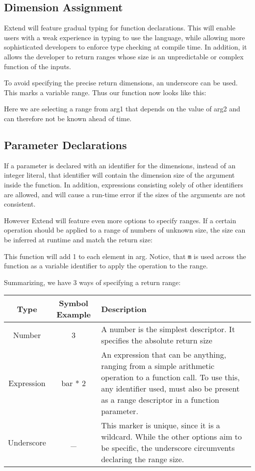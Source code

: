 \subsection{Dimension Assignment}
\par Extend will feature gradual typing for function declarations. This will enable users with a weak experience in typing to use the language, while allowing more sophisticated developers to enforce type checking at compile time. In addition, it allows the developer to return ranges whose size is an unpredictable or complex function of the inputs.
\par To avoid specifying the precise return dimensions, an underscore can be used. This marks a variable range. Thus our function now looks like this:

Here we are selecting a range from arg1 that depends on the value of arg2 and can therefore not be known ahead of time.
\subsection{Parameter Declarations}
If a parameter is declared with an identifier for the dimensions, instead of an integer literal, that identifier will contain the dimension size of the argument inside the function. In addition, expressions consisting solely of other identifiers are allowed, and will cause a run-time error if the sizes of the arguments are not consistent.
\par However Extend will feature even more options to specify ranges. If a certain operation should be applied to a range of numbers of unknown size, the size can be inferred at runtime and match the return size:

This function will add 1 to each element in arg. Notice, that \texttt{m} is used across the function as a variable identifier to apply the operation to the range.
\par Summarizing, we have 3 ways of specifying a return range:\newline
\begin{tabularx}{\columnwidth}{| c | c | X |} \hline
Type & Symbol Example & Description \\ \hline
Number & 3 & A number is the simplest descriptor. It specifies the absolute return size \\ \hline
Expression & bar * 2 & An expression that can be anything, ranging from a simple arithmetic operation to a function call. To use this, any identifier used, must also be present as a range descriptor in a function parameter. \\ \hline
Underscore & \_ & This marker is unique, since it is a wildcard. While the other options aim to be specific, the underscore circumvents declaring the range size. \\ \hline
\end{tabularx}
